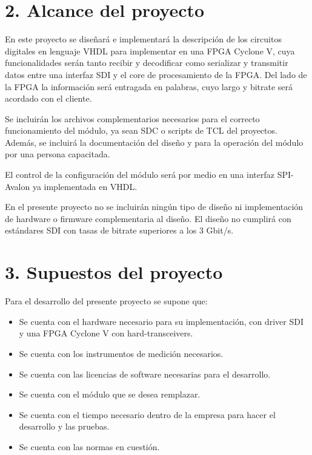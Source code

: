 \documentclass[11pt]{charter}
\begin{document}
\section{2. Alcance del proyecto}
\label{sec:alcance}

En este proyecto se diseñará e implementará la descripción de los circuitos digitales en lenguaje VHDL para implementar en una FPGA Cyclone V, cuya funcionalidades serán tanto recibir y decodificar como serializar y transmitir datos entre una interfaz SDI y el core de procesamiento de la FPGA. Del lado de la FPGA la información será entragada en palabras, cuyo largo y bitrate será acordado con el cliente.

Se incluirán los archivos complementarios necesarios para el correcto funcionamiento del módulo, ya sean SDC o scripts de TCL del proyectos. Además, se incluirá la documentación del diseño y para la operación del módulo por una persona capacitada.

El control de la configuración del módulo será por medio en una interfaz SPI-Avalon ya implementada en VHDL.

En el presente proyecto no se incluirán ningún tipo de diseño ni implementación de hardware o firmware complementaria al diseño. El diseño no cumplirá con estándares SDI con tasas de bitrate superiores a los 3 Gbit/s.

\section{3. Supuestos del proyecto}
\label{sec:supuestos}

Para el desarrollo del presente proyecto se supone que:

\begin{itemize}
\item Se cuenta con el hardware necesario para su implementación, con driver SDI y una FPGA Cyclone V con hard-transceivers.
\item Se cuenta con los instrumentos de medición necesarios.
\item Se cuenta con las licencias de software necesarias para el desarrollo.
\item Se cuenta con el módulo que se desea remplazar.
\item Se cuenta con el tiempo necesario dentro de la empresa para hacer el desarrollo y las pruebas.
\item Se cuenta con las normas en cuestión.
\end{itemize}
\end{document}

